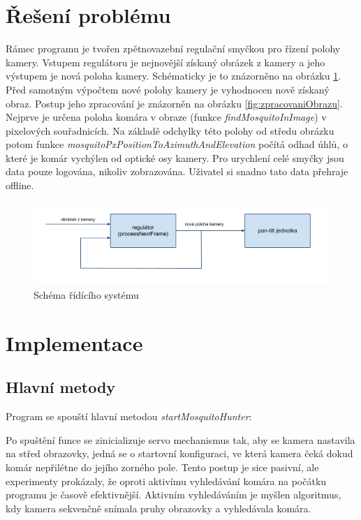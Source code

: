 \documentclass[a4paper,10pt]{article}
\begin{document}
\section{Řešení problému}

		Rámec programu je tvořen zpětnovazební regulační smyčkou pro řízení polohy
		kamery. Vstupem regulátoru je nejnovější získaný obrázek z kamery a jeho
		výstupem je nová poloha kamery. Schématicky je to znázorněno na obrázku
		\ref{fig:ridiciSystem}.  Před samotným výpočtem nové polohy kamery je vyhodnocen
		nově získaný obraz. Postup jeho zpracování je znázorněn na obrázku
		\ref{fig:zpracovaniObrazu}.  Nejprve je určena poloha komára v obraze (funkce
		\textit{findMosquitoInImage}) v pixelových souřadnicích. Na základě odchylky
		této polohy od středu obrázku potom funkce
		\textit{mosquitoPxPositionToAzimuthAndElevation} počítá odhad úhlů, o které je
		komár vychýlen od optické osy kamery. Pro urychlení celé smyčky jsou data pouze
		logována, nikoliv zobrazována. Uživatel si snadno tato data přehraje offline.

		\begin{figure}[!h]
			\centering
			 \includegraphics[width=1\columnwidth]{pics/schema_ridiciho_systemu}
			 \caption{Schéma řídícího systému}\label{fig:ridiciSystem}
		\end{figure}


\section{Implementace}

\subsection{Hlavní metody}

		Program se spouští hlavní metodou \textit{startMosquitoHunter}:

		Po spuštění funce se zinicializuje servo mechanismus tak, aby se kamera
		nastavila na střed obrazovky, jedná se o startovní konfiguraci, ve která kamera
		čeká dokud komár nepřilétne do jejího zorného pole. Tento postup je sice
		pasivní, ale experimenty prokázaly, že oproti aktivímu vyhledávání komára na
		počátku programu je časově efektivnější. Aktivním vyhledáváním je myšlen
		algoritmus, kdy kamera sekvenčně snímala pruhy obrazovky a vyhledávala komára.
\end{document}
